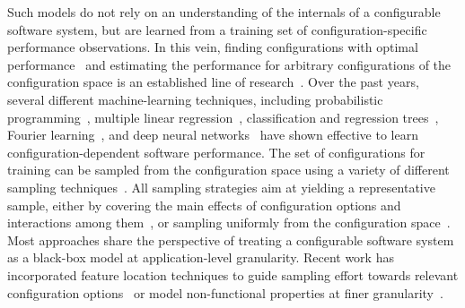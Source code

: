 
Such models do not rely on an understanding of the internals of a configurable software system, but are learned from a training set of configuration-specific performance observations. In this vein, finding configurations with optimal performance~\cite{chen_mmo_2021,nairUsingBadLearners2017,nairFlash18,ohFindingNearoptimalConfigurations2017} and estimating the performance for arbitrary configurations of the configuration space is an established line of research~\cite{dorn2020,siegmundPerformanceinfluenceModelsHighly2015,haDeepPerf2019,perfAL,guoVariabilityawarePerformancePrediction2013,sarkarCostEfficientSamplingPerformance,guo_2018_data,fourier_learning_2015,perLasso,chen_hinnperf_2022}.
Over the past years, several different machine-learning techniques, including probabilistic programming~\cite{dorn2020}, multiple linear regression~\cite{siegmundPerformanceinfluenceModelsHighly2015}, classification and regression trees~\cite{guoVariabilityawarePerformancePrediction2013,sarkarCostEfficientSamplingPerformance,guo_2018_data}, Fourier learning~\cite{fourier_learning_2015,perLasso}, and deep neural networks~\cite{haDeepPerf2019,perfAL,chen_hinnperf_2022} have shown effective to learn configuration-dependent software performance.
The set of configurations for training can be sampled from the configuration space using a variety of different sampling techniques~\cite{kaltenecker_interplay_2020}. All sampling strategies aim at yielding a representative sample, either by covering the main effects of configuration options and interactions among them~\cite{siegmundPredictingPerformanceAutomated2012}, or sampling uniformly from the configuration space~\cite{ohFindingNearoptimalConfigurations2017,kaltenecker_distance-based_2019}.
Most approaches share the perspective of treating a configurable software system as a black-box model at application-level granularity. Recent work has incorporated feature location techniques to guide sampling effort towards relevant configuration options~\cite{velez_2020_configcrusher_jase,velez_comprex_2021} or model non-functional properties at finer granularity~\cite{weber_white_2021,han_confprof_2021}.

